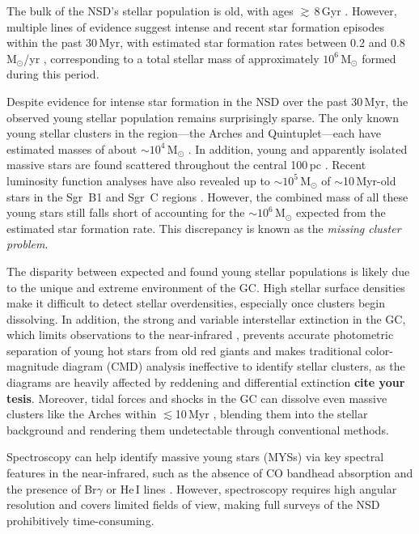 \documentclass{aa} %
\begin{document}
	The bulk of the NSD's stellar population is old, with ages $\gtrsim$\,8\,Gyr \citep{paco_nature_2020}. However, multiple lines of evidence suggest intense and recent star formation episodes within the past 30\,Myr, with estimated star formation rates between 0.2 and 0.8\,M$_\odot$/yr \citep{three_cepheids, paco_nature_2020}, corresponding to a total stellar mass of approximately $10^6$\,M$_\odot$ formed during this period. 
	
	Despite evidence for intense star formation in the NSD over the past 30\,Myr, the observed young stellar population remains surprisingly sparse. The only known young stellar clusters in the region—the Arches and Quintuplet—each have estimated masses of about $\sim10^4$\,M$_\odot$ \citep{Bartko_2010, Lu_2013}. In addition, young and apparently isolated massive stars are found scattered throughout the central 100\,pc \citep[e.g.][]{Massive_stars, Cano, Clark_2023}. Recent luminosity function analyses have also revealed up to $\sim10^5$\,M$_\odot$ of $\sim$10\,Myr-old stars in the Sgr~B1 and Sgr~C regions \citep{Paco_B1, Paco_SgrC}. However, the combined mass of all these young stars still falls short of accounting for the $\sim10^6$\,M$_\odot$ expected from the estimated star formation rate. This discrepancy is known as the \textit{missing cluster problem}.
	
	
	The disparity between expected and found young stellar populations is likely due to the unique and extreme environment of the GC. High stellar surface densities make it difficult to detect stellar overdensities, especially once clusters begin dissolving. In addition, the strong and variable interstellar extinction in the GC, which limits observations to the near-infrared \citep{extinction_los, paco_exctinction}, prevents accurate photometric separation of young hot stars from old red giants and makes traditional color-magnitude diagram (CMD) analysis ineffective to identify stellar clusters, as the diagrams are heavily affected by reddening and differential extinction \citep{GNSI} \textbf{cite your tesis}. Moreover, tidal forces and shocks in the GC can dissolve even massive clusters like the Arches within $\lesssim$10\,Myr \citep{dissolve_GC, cluster_dissolution}, blending them into the stellar background and rendering them undetectable through conventional methods.
	
	Spectroscopy can help identify massive young stars (MYSs) via key spectral features in the near-infrared, such as the absence of CO bandhead absorption and the presence of Br$\gamma$ or He\,I lines \citep{spec_class_1, spec_class_2, Candela}. However, spectroscopy requires high angular resolution and covers limited fields of view, making full surveys of the NSD prohibitively time-consuming.
	
\end{document}
